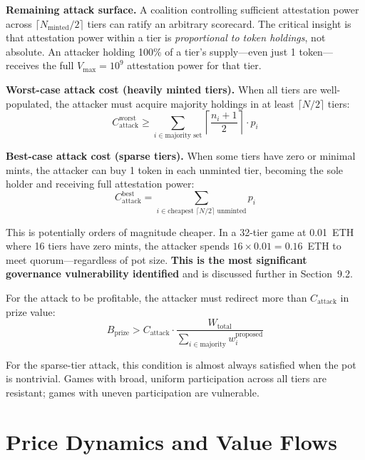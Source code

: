 \documentclass[11pt,a4paper]{article}
\begin{document}
\textbf{Remaining attack surface.} A coalition controlling sufficient attestation power across $\lceil N_{\text{minted}}/2 \rceil$ tiers can ratify an arbitrary scorecard. The critical insight is that attestation power within a tier is \emph{proportional to token holdings}, not absolute. An attacker holding 100\% of a tier's supply---even just 1 token---receives the full $V_{\text{max}} = 10^9$ attestation power for that tier.

\textbf{Worst-case attack cost (heavily minted tiers).} When all tiers are well-populated, the attacker must acquire majority holdings in at least $\lceil N/2 \rceil$ tiers:
\begin{equation}
C_{\text{attack}}^{\text{worst}} \geq \sum_{i \in \text{majority set}} \left\lceil \frac{n_i + 1}{2} \right\rceil \cdot p_i
\end{equation}

\textbf{Best-case attack cost (sparse tiers).} When some tiers have zero or minimal mints, the attacker can buy 1 token in each unminted tier, becoming the sole holder and receiving full attestation power:
\begin{equation}\label{eq:cheapattack}
C_{\text{attack}}^{\text{best}} = \sum_{i \in \text{cheapest } \lceil N/2 \rceil \text{ unminted}} p_i
\end{equation}

This is potentially orders of magnitude cheaper. In a 32-tier game at 0.01~ETH where 16 tiers have zero mints, the attacker spends $16 \times 0.01 = 0.16$~ETH to meet quorum---regardless of pot size. \textbf{This is the most significant governance vulnerability identified} and is discussed further in Section~9.2.

For the attack to be profitable, the attacker must redirect more than $C_{\text{attack}}$ in prize value:
\begin{equation}
B_{\text{prize}} > C_{\text{attack}} \cdot \frac{W_{\text{total}}}{\sum_{i \in \text{majority}} w_i^{\text{proposed}}}
\end{equation}

For the sparse-tier attack, this condition is almost always satisfied when the pot is nontrivial. Games with broad, uniform participation across all tiers are resistant; games with uneven participation are vulnerable.

\section{Price Dynamics and Value Flows}
\end{document}
